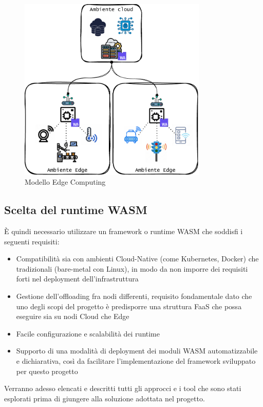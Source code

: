 \FloatBarrier
\begin{figure}[h]
    \centering
    \includegraphics[width=0.8\textwidth]{img/schemi/schemi-Scenari.drawio.pdf}
    \caption{Modello Edge Computing}
    \label{fig:modello_edge_computing}
\end{figure}
\FloatBarrier

\subsection{Scelta del runtime WASM}

È quindi necessario utilizzare un framework o runtime WASM che soddisfi i seguenti requisiti:
\begin{itemize}
    \item Compatibilità sia con ambienti Cloud-Native (come Kubernetes, Docker) che tradizionali (bare-metal con Linux), in modo da non imporre dei requisiti forti nel deployment dell'infrastruttura
    \item Gestione dell'offloading fra nodi differenti, requisito fondamentale dato che uno degli scopi del progetto è predisporre una struttura FaaS che possa eseguire sia su nodi Cloud che Edge
    \item Facile configurazione e scalabilità dei runtime
    \item Supporto di una modalità di deployment dei moduli WASM automatizzabile e dichiarativa, così da facilitare l'implementazione del framework sviluppato per questo progetto
\end{itemize}

Verranno adesso elencati e descritti tutti gli approcci e i tool che sono stati esplorati prima di giungere alla soluzione adottata nel progetto.

